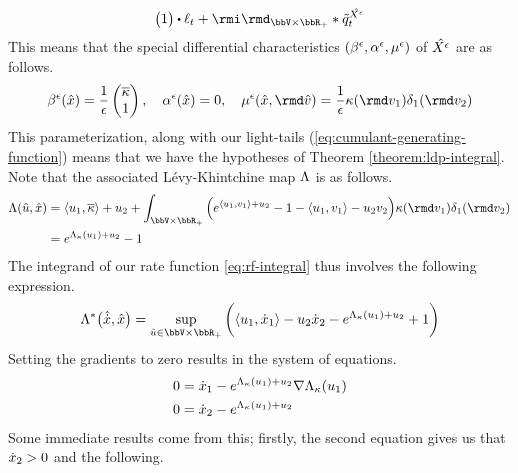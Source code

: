 \begin{example}
\begin{equation*}
\begin{pmatrix}
      1
    \end{pmatrix} \shortInt \leb_t + \id_{\vecSpace\times\bbR_+} \ast \compensate{\jumpMeas^{\hat\Xee}}_t
  \end{equation*}
  This means that the special differential characteristics $(\beta^\epsilon, \alpha^\epsilon, \mu^\epsilon)$ of $\hat{X^\epsilon}$ are as follows.
  \begin{equation*}
    \affDrift^\epsilon(\hat\stateVar) = \frac1\epsilon \begin{pmatrix} \overline\affDist \\ 1 \end{pmatrix}, \quad
    \affDiff^\epsilon(\hat\stateVar) = 0, \quad
    \affJump^\epsilon(\hat\stateVar, \rmd\hat\markVar) = \frac1\epsilon \affDist(\rmd\markVar_1) \delta_1(\rmd\markVar_2)
  \end{equation*}
  This parameterization, along with our light-tails (\ref{eq:cumulant-generating-function}) means that we have the hypotheses of Theorem \ref{theorem:ldp-integral}.
  Note that the associated L\'evy-Khintchine map $\Lambda$ is as follows.
  \begin{align*}
    \ode(\hat\momentVar, \hat\stateVar) 
    &= \prj{\momentVar_1}{\overline\affDist} + \momentVar_2 + \int_{\vecSpace \times \bbR_+} \Big( e^{\prj{\momentVar_1}{\markVar_1} + \momentVar_2} - 1 - \prj{\momentVar_1}{\markVar_1} - \momentVar_2\markVar_2 \Big) \affDist(\rmd\markVar_1)\delta_1(\rmd\markVar_2) \\
    &= e^{\ode_\affDist(\momentVar_1)+\momentVar_2} - 1
  \end{align*}
  The integrand of our rate function \ref{eq:rf-integral} thus involves the following expression.
  \begin{equation*}
    \ode^*\big(\hat\diffVar, \hat\stateVar\big)
    = \sup_{\hat\momentVar\in\vecSpace \times \bbR_+} \bigg( \prj{\momentVar_1}{\diffVar_1} - \momentVar_2\diffVar_2 - e^{\ode_\affDist(\momentVar_1) + \momentVar_2} + 1 \bigg)
  \end{equation*}
  Setting the gradients to zero results in the system of equations.
  \begin{align*}
    0 &= \dot{x}_1 - e^{\Lambda_\kappa(u_1)+u_2} \nabla\Lambda_\kappa(u_1) \\
    0 &= \dot{x}_2 - e^{\Lambda_\kappa(u_1)+u_2}
  \end{align*}
  Some immediate results come from this; firstly, the second equation gives us that $\dot{x}_2 > 0$ and the following.
  \begin{equation}

\end{equation}
\end{example}
